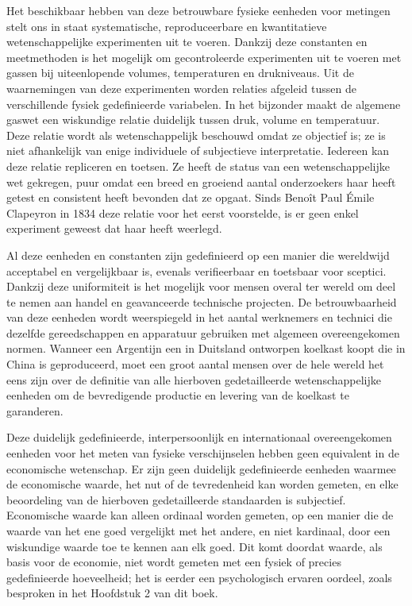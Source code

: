 \documentclass[
  a5paper,
  smalldemyvopaper,11pt,twoside,onecolumn,openright,extrafontsizes,
hidelinks]{memoir}
\begin{document}
Het beschikbaar hebben van deze betrouwbare fysieke eenheden voor
metingen stelt ons in staat systematische, reproduceerbare en
kwantitatieve wetenschappelijke experimenten uit te voeren. Dankzij deze
constanten en meetmethoden is het mogelijk om gecontroleerde
experimenten uit te voeren met gassen bij uiteenlopende volumes,
temperaturen en drukniveaus. Uit de waarnemingen van deze experimenten
worden relaties afgeleid tussen de verschillende fysiek gedefinieerde
variabelen. In het bijzonder maakt de algemene gaswet een wiskundige
relatie duidelijk tussen druk, volume en temperatuur. Deze relatie wordt
als wetenschappelijk beschouwd omdat ze objectief is; ze is niet
afhankelijk van enige individuele of subjectieve interpretatie. Iedereen
kan deze relatie repliceren en toetsen. Ze heeft de status van een
wetenschappelijke wet gekregen, puur omdat een breed en groeiend aantal
onderzoekers haar heeft getest en consistent heeft bevonden dat ze
opgaat. Sinds Benoît Paul Émile Clapeyron in 1834 deze relatie voor het
eerst voorstelde, is er geen enkel experiment geweest dat haar heeft
weerlegd.

Al deze eenheden en constanten zijn gedefinieerd op een manier die
wereldwijd acceptabel en vergelijkbaar is, evenals verifieerbaar en
toetsbaar voor sceptici. Dankzij deze uniformiteit is het mogelijk voor
mensen overal ter wereld om deel te nemen aan handel en geavanceerde
technische projecten. De betrouwbaarheid van deze eenheden wordt
weerspiegeld in het aantal werknemers en technici die dezelfde
gereedschappen en apparatuur gebruiken met algemeen overeengekomen
normen. Wanneer een Argentijn een in Duitsland ontworpen koelkast koopt
die in China is geproduceerd, moet een groot aantal mensen over de hele
wereld het eens zijn over de definitie van alle hierboven gedetailleerde
wetenschappelijke eenheden om de bevredigende productie en levering van
de koelkast te garanderen.

Deze duidelijk gedefinieerde, interpersoonlijk en internationaal
overeengekomen eenheden voor het meten van fysieke verschijnselen hebben
geen equivalent in de economische wetenschap. Er zijn geen duidelijk
gedefinieerde eenheden waarmee de economische waarde, het nut of de
tevredenheid kan worden gemeten, en elke beoordeling van de hierboven
gedetailleerde standaarden is subjectief. Economische waarde kan alleen
ordinaal worden gemeten, op een manier die de waarde van het ene goed
vergelijkt met het andere, en niet kardinaal, door een wiskundige waarde
toe te kennen aan elk goed. Dit komt doordat waarde, als basis voor de
economie, niet wordt gemeten met een fysiek of precies gedefinieerde
hoeveelheid; het is eerder een psychologisch ervaren oordeel, zoals
besproken in het Hoofdstuk 2 van dit boek.
\end{document}
